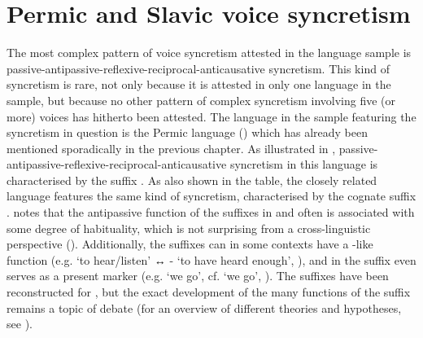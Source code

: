 \section{Permic and Slavic voice syncretism} \label{sec:complex-syncretism:multiplex}
The most complex pattern of voice syncretism attested in the language sample is passive-antipassive-reflexive-reciprocal-anticausative syncretism. This kind of syncretism is rare, not only because it is attested in only one language in the sample, but because no other pattern of complex syncretism involving five (or more) voices has hitherto been attested. The language in the sample featuring the syncretism in question is the Permic language  () which has already been mentioned sporadically in the previous chapter. As illustrated in , passive-antipassive-reflexive-reciprocal-anticausative syncretism in this language is characterised by the suffix . As also shown in the table, the closely related language  features the same kind of syncretism, characterised by the cognate suffix . \citet[284]{bartens:2000} notes that the antipassive function of the suffixes in  and  often is associated with some degree of habituality, which is not surprising from a cross-linguistic perspective (\citealt{polinsky:2017}). Additionally, the suffixes can in some contexts have a -like function (e.g.   ‘to hear/listen’ ↔ - ‘to have heard enough’, \citealt[285]{bartens:2000}), and in  the suffix  even serves as a present  marker (e.g.   ‘we go’, cf.   ‘we go’, \citealt[179ff.]{bartens:2000}). The suffixes have been reconstructed  for , but the exact development of the many functions of the suffix remains a topic of debate (for an overview of different theories and hypotheses, see \citealt[168ff.]{kozmacs:2003}).

